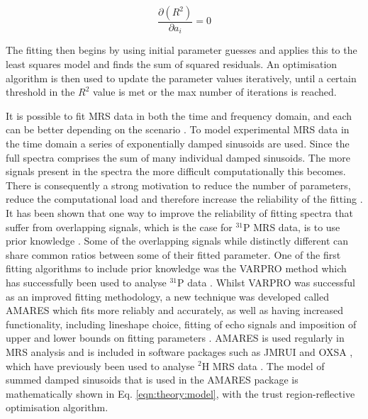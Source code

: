 \begin{equation}
    \frac{\partial (R^2)}{\partial a_i} = 0
    \label{eqn:theory:Diff}
\end{equation}

\noindent The fitting then begins by using initial parameter guesses and applies this to the least squares model and finds the sum of squared residuals. An optimisation algorithm is then used to update the parameter values iteratively, until a certain threshold in the $R^2$ value is met or the max number of iterations is reached. 

It is possible to fit MRS data in both the time and frequency domain, and each can be better depending on the scenario \cite{Poullet2008MRSMethods}. To model experimental \ac{MRS} data in the time domain a series of exponentially damped sinusoids are used. Since the full spectra comprises the sum of many individual damped sinusoids. The more signals present in the spectra the more difficult computationally this becomes. There is consequently a strong motivation to reduce the number of parameters, reduce the computational load and therefore increase the reliability of the fitting \cite{Near2021PreprocessingRecommendations}. It has been shown that one way to improve the reliability of fitting spectra that suffer from overlapping signals, which is the case for $^{31}$P \ac{MRS} data, is to use prior knowledge \cite{Hamilton2003PriorSpectra}. Some of the overlapping signals while distinctly different can share common ratios between some of their fitted parameter. One of the first fitting algorithms to include prior knowledge was the \ac{VARPRO} method \cite{Golub1973TheSeparate} which has successfully been used to analyse $^{31}$P data \cite{vanderVeen1988AccurateKnowledge,Stubbs199631P-MagneticADP}. Whilst \ac{VARPRO} was successful as an improved fitting methodology, a new technique was developed called \ac{AMARES} which fits more reliably and accurately, as well as having increased functionality, including lineshape choice, fitting of echo signals and imposition of upper and lower bounds on fitting parameters \cite{Vanhamme1997ImprovedKnowledge}. \ac{AMARES} is used regularly in \ac{MRS} analysis and is included in software packages such as JMRUI \cite{Stefan2009QuantitationPackage} and OXSA \cite{Purvis2017OXSA:MATLAB}, which have previously been used to analyse $^2$H \ac{MRS} data \cite{Simoes2022GlucoseGlioblastoma,Kreis2020MeasuringMRI,Kaggie2022DeuteriumMetabolism}. The model of summed damped sinusoids that is used in the \ac{AMARES} package is mathematically shown in Eq. \ref{eqn:theory:model}, with the trust region-reflective optimisation algorithm.

